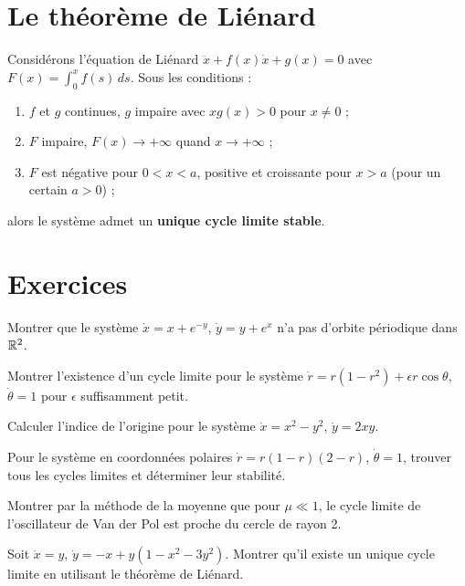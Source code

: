 \section{Le th\'eor\`eme de Li\'enard}

\begin{theoreme}[Li\'enard]
Consid\'erons l'\'equation de Li\'enard $\ddot{x} + f(x)\dot{x} + g(x) = 0$
avec $F(x) = \int_0^x f(s)\, ds$. Sous les conditions :
\begin{enumerate}
    \item $f$ et $g$ continues, $g$ impaire avec $xg(x) > 0$ pour $x \neq 0$ ;
    \item $F$ impaire, $F(x) \to +\infty$ quand $x \to +\infty$ ;
    \item $F$ est n\'egative pour $0 < x < a$, positive et croissante pour
    $x > a$ (pour un certain $a > 0$) ;
\end{enumerate}
alors le syst\`eme admet un \textbf{unique cycle limite stable}.
\end{theoreme}

\section{Exercices}

\begin{exercice}[Bendixson]
Montrer que le syst\`eme $\dot{x} = x + e^{-y}$, $\dot{y} = y + e^x$ n'a
pas d'orbite p\'eriodique dans $\mathbb{R}^2$.
\end{exercice}

\begin{exercice}
Montrer l'existence d'un cycle limite pour le syst\`eme
$\dot{r} = r(1-r^2) + \epsilon r\cos\theta$,
$\dot{\theta} = 1$ pour $\epsilon$ suffisamment petit.
\end{exercice}

\begin{exercice}[Indice]
Calculer l'indice de l'origine pour le syst\`eme
$\dot{x} = x^2 - y^2$, $\dot{y} = 2xy$.
\end{exercice}

\begin{exercice}
Pour le syst\`eme en coordonn\'ees polaires
$\dot{r} = r(1-r)(2-r)$, $\dot{\theta} = 1$, trouver tous les cycles
limites et d\'eterminer leur stabilit\'e.
\end{exercice}

\begin{exercice}
Montrer par la m\'ethode de la moyenne que pour $\mu \ll 1$, le cycle limite
de l'oscillateur de Van der Pol est proche du cercle de rayon 2.
\end{exercice}

\begin{exercice}[Unicit\'e]
Soit $\dot{x} = y$, $\dot{y} = -x + y(1 - x^2 - 3y^2)$. Montrer qu'il
existe un unique cycle limite en utilisant le th\'eor\`eme de Li\'enard.
\end{exercice}
